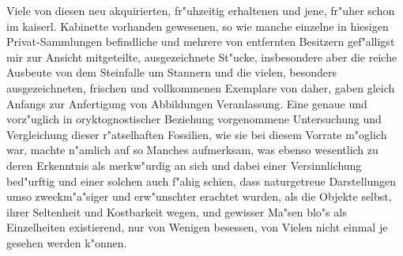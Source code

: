 \documentclass[a4paper, 11pt, oneside, german]{article}
\begin{document}
Viele von diesen neu akquirierten, fr"uhzeitig erhaltenen und jene, fr"uher schon im kaiserl. Kabinette vorhanden gewesenen, so wie manche einzelne in hiesigen Privat-Sammlungen befindliche und mehrere von entfernten Besitzern gef"alligst mir zur Ansicht mitgeteilte, ausgezeichnete St"ucke, insbesondere aber die reiche Ausbeute von dem Steinfalle um Stannern und die vielen, besonders ausgezeichneten, frischen und vollkommenen Exemplare von daher, gaben gleich Anfangs zur Anfertigung von Abbildungen Veranlassung. Eine genaue und vorz"uglich in oryktognostischer Beziehung vorgenommene Untersuchung und Vergleichung dieser r"atselhaften Fossilien, wie sie bei diesem Vorrate m"oglich war, machte n"amlich auf so Manches aufmerksam, was ebenso wesentlich zu deren Erkenntnis als merkw"urdig an sich und dabei einer Versinnlichung bed"urftig und einer solchen auch f"ahig schien, dass naturgetreue Darstellungen umso zweckm"a"siger und erw"unschter erachtet wurden, als die Objekte selbst, ihrer Seltenheit und Kostbarkeit wegen, und gewisser Ma"sen blo"s als Einzelheiten existierend, nur von Wenigen besessen, von Vielen nicht einmal je gesehen werden k"onnen.
\end{document}
